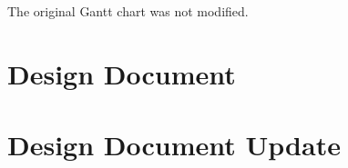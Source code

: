 \documentclass[10pt,journal,compsoc,draftclsnofoot]{IEEEtran}
\begin{document}
\begin{flushleft}
\begin{center}
\begin{table}[H]
\begin{tabular}{ | p{0.3\linewidth} | p{0.3\linewidth} | p{0.3\linewidth} | }
\end{tabular}
\newline
\label{table:RequirementsDocumentUpdate}
\end{table}
\end{center}

The original Gantt chart was not modified.

\newpage

\section{Design Document}

\newpage



\section{Design Document Update}


\end{flushleft}
\end{document}
